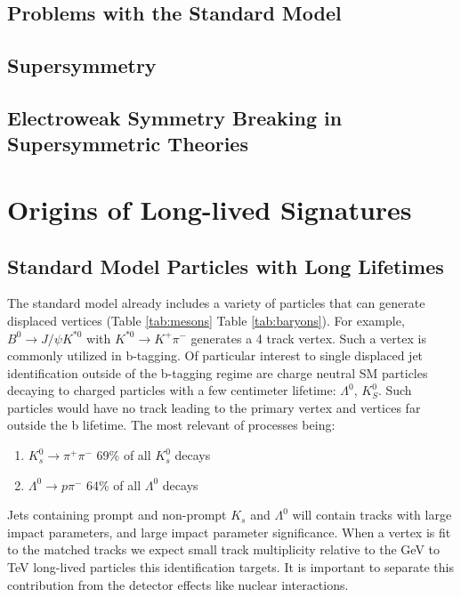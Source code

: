 \subsection{Problems with the Standard Model}

\subsection{Supersymmetry}

\subsection{Electroweak Symmetry Breaking in Supersymmetric Theories}

\section{Origins of Long-lived Signatures}

\subsection{Standard Model Particles with Long Lifetimes}

The standard model already includes a variety of particles that can generate
 displaced vertices (Table \ref{tab:mesons} Table \ref{tab:baryons}). 
For example, $B^0 \rightarrow J/\psi K^{*0}$ with $K^{*0} \rightarrow K^+\pi^-$ 
generates a 4 track vertex. Such a vertex is commonly utilized 
in b-tagging. Of particular interest to single displaced jet identification outside of the b-tagging regime are charge neutral SM particles
decaying to charged particles with a few centimeter lifetime: $\Lambda^0$, $K_S^0$. Such particles would have no track
leading to the primary vertex and vertices far outside the b lifetime. The most relevant of processes being:

\begin{enumerate}
\item $K_s^0 \rightarrow \pi^+\pi^-$ 69\% of all $K_s^0$ decays 
\item $\Lambda^0 \rightarrow p \pi^-$ 64\% of all $\Lambda^0$ decays 
\end{enumerate}

Jets containing prompt and non-prompt $K_s$ and $\Lambda^0$ will contain tracks with large impact parameters, 
and large impact parameter significance. When a vertex is fit to the matched tracks we expect small track multiplicity relative 
to the GeV to TeV   long-lived particles this identification targets. It is important to separate this contribution from
the detector effects like nuclear interactions.


